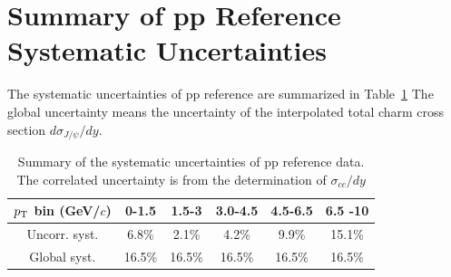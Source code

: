 \section{Summary of pp Reference Systematic Uncertainties}
The systematic uncertainties of pp reference are summarized in Table~\ref{table_4_pprefsys}
The global uncertainty means the uncertainty of the interpolated total charm cross section $d\sigma_{J/\psi} /dy$.
\begin{table}[!h]
	\centering
	\begin{tabular}{cccccc}  \hline
		$p_{\rm{T}}$ bin (GeV/$c$)& 0-1.5 & 1.5-3 & 3.0-4.5 & 4.5-6.5 & 6.5 -10 \\ \hline
		Uncorr. syst. & 6.8\%  & 2.1\%  &   4.2\% & 9.9\% & 15.1\%    \\ \hline   	
		Global syst. & 16.5\%  & 16.5\%  &   16.5\% & 16.5\% &16.5\%    \\ \hline   	
	\end{tabular}
	\caption{Summary of the systematic uncertainties of pp reference data. The correlated uncertainty is from the determination of $\sigma_{cc}/dy$}
	\label{table_4_pprefsys}
\end{table}


